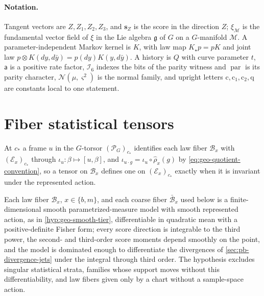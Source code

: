 \paragraph{Notation.}
Tangent vectors are $Z,Z_1,Z_2,Z_3$, and $\mathbf s_Z$ is the score in the direction $Z$;
$\xi_{\mathcal M}$ is the fundamental vector field of $\xi$ in the Lie algebra
$\mathfrak g$ of $G$ on a $G$-manifold $\mathcal M$.  A parameter-independent Markov
kernel is $K$, with law map $K_\star p=pK$ and joint law
$p\otimes K(dy,d\bar y)=p(dy)K(y,d\bar y)$.  A history is $Q$ with curve parameter $t$,
$\mathsf a$ is a positive rate factor, $\mathcal I_6$ indexes the bits of the parity
witness and $\operatorname{par}$ is its parity character, $\mathcal N(\mu,\varsigma^2)$ is
the normal family, and upright letters $\mathrm c,\mathrm c_1,\mathrm c_2,\mathrm q$ are
constants local to one statement.

\section{Fiber statistical tensors}
\label{sec:pb-statistical-tensors}
\label{sec:ig-typing}
\label{sec:ig-notclaimed}

At $c_*$ a frame $u$ in the $G$-torsor $(\mathscr P_G)_{c_*}$ identifies each law fiber
$\mathcal B_x$ with $(\mathcal E_x)_{c_*}$ through $\iota_u:\beta\mapsto[u,\beta]$, and
$\iota_{u\cdot g}=\iota_u\circ\widehat\rho_x(g)$ by \eqref{eq:geo-quotient-convention},
so a tensor on $\mathcal B_x$ defines one on $(\mathcal E_x)_{c_*}$ exactly when it is
invariant under the represented action.

Each law fiber $\mathcal B_x$, $x\in\{b,m\}$, and each coarse fiber $\bar{\mathcal B}_x$
used below is a finite-dimensional smooth parametrized-measure model with smooth
represented action, as in \cref{hyp:geo-smooth-tier}, differentiable in quadratic mean
with a positive-definite Fisher form; every score direction is integrable to the third
power, the second- and third-order score moments depend smoothly on the point, and the
model is dominated enough to differentiate the divergences of
\cref{sec:pb-divergence-jets} under the integral through third order.  The hypothesis
excludes singular statistical strata, families whose support moves without this
differentiability, and law fibers given only by a chart without a sample-space action.

